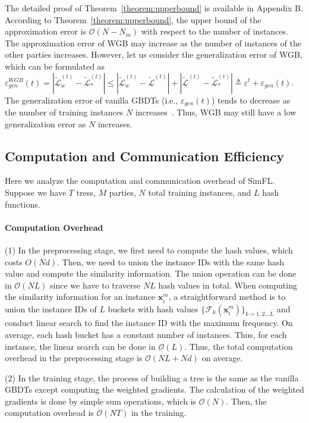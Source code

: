 \documentclass[letterpaper]{article} %
\theoremstyle{definition}
\newcommand{\mc}[1]{\mathcal{#1}}
\begin{document}
The detailed proof of Theorem~\ref{theorem:upperbound} is available in Appendix B. According to Theorem~\ref{theorem:upperbound}, the upper bound of the approximation error is $\mathcal{O}(N-N_m)$ with respect to the number of instances. The approximation error of WGB may increase as the number of instances of the other parties increases. However, let us consider the generalization error of WGB, which can be formulated as $\varepsilon_{gen}^{WGB}(t) = |\mathcal{\tilde{L}}_w^{(t)}-\mathcal{\tilde{L}}_*^{(t)}| \leq |\mathcal{\tilde{L}}_w^{(t)} - \mathcal{\tilde{L}}^{(t)}| + |\mathcal{\tilde{L}}^{(t)}-\mathcal{\tilde{L}}_*^{(t)}|\triangleq \varepsilon^t + \varepsilon_{gen}(t)$. The generalization error of vanilla GBDTs (i.e., $\varepsilon_{gen}(t)$) tends to decrease as the number of training instances $N$ increases~\cite{shalev2014understanding}. Thus, WGB may still have a low generalization error as $N$ increases.


\subsection{Computation and Communication Efficiency}
Here we analyze the computation and communication overhead of SimFL. Suppose we have $T$ tress, $M$ parties, $N$ total training instances, and $L$ hash functions.

\paragraph{Computation Overhead} (1) In the preprocessing stage, we first need to compute the hash values, which costs $O(Nd)$. Then, we need to union the instance IDs with the same hash value and compute the similarity information. The union operation can be done in $\mathcal{O}(NL)$ since we have to traverse $NL$ hash values in total. When computing the similarity information for an instance $\mathbf{x}_i^m$, a straightforward method is to union the instance IDs of $L$ buckets with hash values $\{\mathcal{F}_k(\mathbf{x}_i^m)\}_{k=1,2...L}$ and conduct linear search to find the instance ID with the maximum frequency. On average, each hash bucket has a constant number of instances. Thus, for each instance, the linear search can be done in $\mc{O}(L)$. Thus, the total computation overhead in the preprocessing stage is $\mc{O}(NL+Nd)$ on average.

(2) In the training stage, the process of building a tree is the same as the vanilla GBDTs except computing the weighted gradients. The calculation of the weighted gradients is done by simple sum operations, which is $\mathcal{O}(N)$. Then, the computation overhead is $\mathcal{O}(NT)$ in the training.
\end{document}
